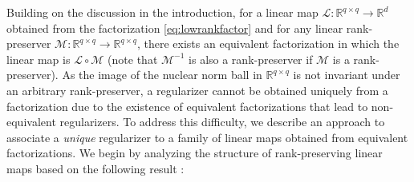 \documentclass[11pt,letterpaper]{article}
\newcommand{\R}{\mathbb{R}}
\renewcommand{\L}{\mathcal{L}}
\begin{document}

Building on the discussion in the introduction, for a linear map $\L : \R^{q \times q} \rightarrow \R^d$ obtained from the factorization \eqref{eq:lowrankfactor} and for any linear rank-preserver $\mathcal{M} : \R^{q \times q} \rightarrow \R^{q \times q}$, there exists an equivalent factorization in which the linear map is $\L \circ \mathcal{M}$ (note that ${\mathcal{M}}^{-1}$ is also a rank-preserver if $\mathcal{M}$ is a rank-preserver).  As the image of the nuclear norm ball in $\R^{q \times q}$ is not invariant under an arbitrary rank-preserver, a regularizer cannot be obtained uniquely from a factorization due to the existence of equivalent factorizations that lead to non-equivalent regularizers.  To address this difficulty, we describe an approach to associate a \emph{unique} regularizer to a family of linear maps obtained from equivalent factorizations.  We begin by analyzing the structure of rank-preserving linear maps based on the following result \cite{MarMoy:59}:
\end{document}

